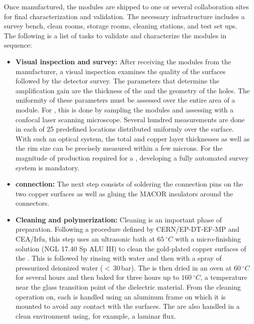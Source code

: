 Once manufactured, the  modules are shipped to one or several collaboration sites for final characterization and validation. The necessary infrastructure includes a survey bench, clean rooms, storage rooms, cleaning stations, and  test set ups. The following is a list of tasks to validate and characterize the modules in sequence:

\begin{itemize}
\item {\bf Visual inspection and survey:} After receiving the  modules from the manufacturer, a visual inspection examines the quality of the  surfaces %
followed by the detector survey. The parameters that determine the  amplification gain are the thickness of the  and the geometry of the holes. The uniformity of these parameters must be assessed over the entire area of a  module. For  , this is done by sampling the modules and assessing with a confocal laser scanning microscope. %
Several hundred measurements are done in each of \num{25} predefined locations distributed uniformly over the  surface. With such an optical system, the total  and copper layer thicknesses as well as the rim size can be precisely measured within a few microns.  %
For the magnitude of production required for a , developing a fully automated survey system is mandatory. 

\item {\bf {} connection:} The next step consists of soldering the  connection pins on the two  copper surfaces as well as gluing the MACOR insulators around the connectors.

\item {\bf Cleaning and polymerization:} Cleaning is an important phase of  preparation. Following a procedure defined by CERN/EP-DT-EF-MP and CEA/Irfu,
 this step uses an ultrasonic bath at $\SI{65}{^\circ{}C}$ with a micro-finishing solution (NGL 17.40 Sp ALU III) to clean the gold-plated copper surfaces of the . This is followed by rinsing with water and then with a spray of pressurized deionized water %
 ($<$\,30\,bar). The  is then dried in an oven 
at $\SI{60}{^\circ{}C}$  for several hours and then baked for three hours up to $\SI{160}{^\circ{}C}$, %
a temperature near the glass transition point of the dielectric material. From the cleaning operation on, each  is handled using an aluminum frame on which it is mounted to avoid any contact with the  surfaces. The  are also %
handled in a clean environment using, for example, a laminar flux.  


\end{itemize}
